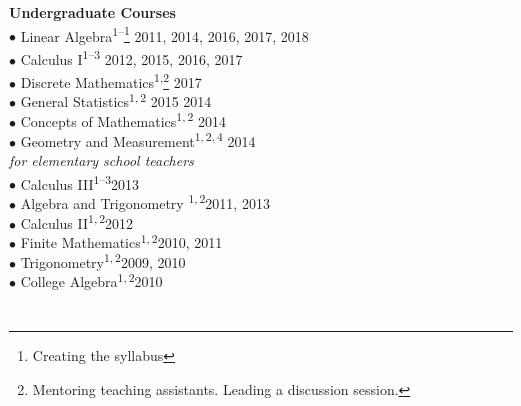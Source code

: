 \documentclass[margin,line,pifont,palatino,courier]{res}
\begin{document}
\begin{resume}
\begin{description}
	\item \textbf{Undergraduate Courses}\\
	$\bullet$ Linear Algebra\textsuperscript{$1$--}\footnote{Creating the syllabus} \hfill 2011, 2014, 2016, 2017, 2018\\
	$\bullet$ Calculus I\textsuperscript{$1$--$3$} \hfill 2012, 2015, 2016, 2017\\
	$\bullet$ Discrete Mathematics\textsuperscript{$1$,}\footnote{Mentoring teaching assistants. Leading a discussion session.} \hfill 2017\\
	$\bullet$ General Statistics\textsuperscript{$1,2$} \hfill  2015  2014\\
	$\bullet$ Concepts of Mathematics\textsuperscript{$1,2$} \hfill 2014	\\
	$\bullet$ Geometry and Measurement\textsuperscript{$1,2,4$} \hfill 2014\\
	\phantom{----}	\textit{for elementary school teachers}\\
	$\bullet$ Calculus III\textsuperscript{$1$--$3$}\hfill 2013 \\
	$\bullet$ Algebra and Trigonometry \textsuperscript{$1,2$}\hfill 2011, 2013\\
	$\bullet$ Calculus II\textsuperscript{$1,2$}\hfill 2012\\
	$\bullet$ Finite Mathematics\textsuperscript{$1,2$}\hfill 2010, 2011\\
	$\bullet$ Trigonometry\textsuperscript{$1,2$}\hfill 2009, 2010\\
	$\bullet$ College Algebra\textsuperscript{$1,2$}\hfill 2010\\
\end{description}
 
\vspace{-15pt}
 
 
\section{} 

\Fields{\Authors\Title\Journal\Year\Vol\Pages\DOI\Link\Summary}

 




\end{resume}
\end{document}
